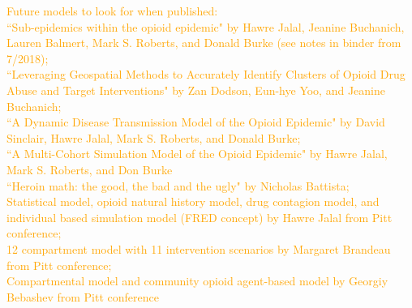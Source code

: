 \documentclass[12pt]{article}
\begin{document}

\textcolor{orange}{Future models to look for when published: \\
``Sub-epidemics within the opioid epidemic" by Hawre Jalal, Jeanine Buchanich, Lauren Balmert, Mark S. Roberts, and Donald Burke (see notes in binder from 7/2018); \\ 
``Leveraging Geospatial Methods to Accurately Identify Clusters of Opioid Drug Abuse and Target Interventions" by Zan Dodson, Eun-hye Yoo, and Jeanine Buchanich; \\
``A Dynamic Disease Transmission Model of the Opioid Epidemic" by David Sinclair, Hawre Jalal, Mark S. Roberts, and Donald Burke; \\ 
``A Multi-Cohort Simulation Model of the Opioid Epidemic" by Hawre Jalal, Mark S. Roberts, and Don Burke \\
``Heroin math: the good, the bad and the ugly" by Nicholas Battista; \\
Statistical model, opioid natural history model, drug contagion model, and individual based simulation model (FRED concept) by Hawre Jalal from Pitt conference; \\
12 compartment model with 11 intervention scenarios by Margaret Brandeau from Pitt conference; \\
Compartmental model and community opioid agent-based model by Georgiy Bebashev from Pitt conference}
\end{document}
